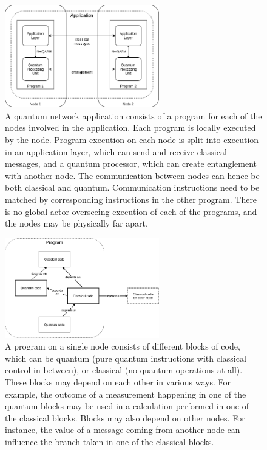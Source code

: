 \begin{figure}[h]
    \centering
    \includegraphics[width=0.6\textwidth]{figures/netqasm/multi_program_app_2.png}
    \caption{A quantum network application consists of a program for each of the nodes involved in the application.
        Each program is locally executed by the node.
        Program execution on each node is split into execution in an application layer, which can send and receive classical messages, and a quantum processor, which can create entanglement with another node.
        The communication between nodes can hence be both classical and quantum.
        Communication instructions need to be matched by corresponding instructions in the other program.
        There is no global actor overseeing execution of each of the programs, and the nodes may be physically far apart.}
    \label{fig:app_programs}
\end{figure}

\begin{figure}[h]
    \centering
    \includegraphics[width=0.6\textwidth]{figures/netqasm/program_decomp.png}
    \caption{A program on a single node consists of different blocks of code, which can be quantum (pure quantum instructions with classical control in between), or classical (no quantum operations at all).
        These blocks may depend on each other in various ways.
        For example, the outcome of a measurement happening in one of the quantum blocks may be used in a calculation performed in one of the classical blocks.
        Blocks may also depend on other nodes.
        For instance, the value of a message coming from another node can influence the branch taken in one of the classical blocks.}
    \label{fig:program_decomp}
\end{figure}



